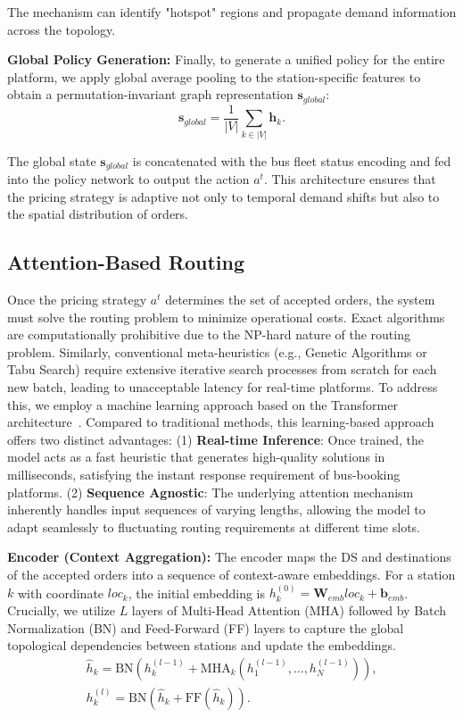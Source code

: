 \documentclass[lettersize,journal]{IEEEtran}
\begin{document}
The mechanism can identify "hotspot" regions and propagate demand information across the topology.

\textbf{Global Policy Generation:} 
Finally, to generate a unified policy for the entire platform, we apply global average pooling to the station-specific features to obtain a permutation-invariant graph representation $\mathbf{s}_{global}$:
\begin{equation}
    \mathbf{s}_{global} = \frac{1}{|V|} \sum_{k \in |V|} \mathbf{h}_k.
\end{equation}

The global state $\mathbf{s}_{global}$ is concatenated with the bus fleet status encoding and fed into the policy network to output the action $a^t$. This architecture ensures that the pricing strategy is adaptive not only to temporal demand shifts but also to the spatial distribution of orders.

\color{black}
\subsection{Attention-Based Routing}
\label{sec:routing}
Once the pricing strategy $a^t$ determines the set of accepted orders, the system must solve the routing problem to minimize operational costs. 
Exact algorithms are computationally prohibitive due to the NP-hard nature of the routing problem. Similarly, conventional meta-heuristics (e.g., Genetic Algorithms or Tabu Search) require extensive iterative search processes from scratch for each new batch, leading to unacceptable latency for real-time platforms. 
To address this, we employ a machine learning approach based on the Transformer architecture~\cite{ref_att}. 
Compared to traditional methods, this learning-based approach offers two distinct advantages: 
(1) \textbf{Real-time Inference}: Once trained, the model acts as a fast heuristic that generates high-quality solutions in milliseconds, satisfying the instant response requirement of bus-booking platforms.
(2) \textbf{Sequence Agnostic}: The underlying attention mechanism inherently handles input sequences of varying lengths, allowing the model to adapt seamlessly to fluctuating routing requirements at different time slots.

\textbf{Encoder (Context Aggregation):} 
The encoder maps the DS and destinations of the accepted orders into a sequence of context-aware embeddings. 
For a station $k$ with coordinate $loc_k$, the initial embedding is $h_k^{(0)} = \mathbf{W}_{emb} loc_k + \mathbf{b}_{emb}$. 
Crucially, we utilize $L$ layers of Multi-Head Attention (MHA) followed by Batch Normalization (BN) and Feed-Forward (FF) layers to capture the global topological dependencies between stations and update the embeddings.
\begin{gather}
    \hat{h}_k = \text{BN}(h_k^{(l-1)} + \text{MHA}_k(h_1^{(l-1)}, \dots, h_N^{(l-1)})), \\
    h_k^{(l)} = \text{BN}(\hat{h}_k + \text{FF}(\hat{h}_k)).
\end{gather}
\end{document}
